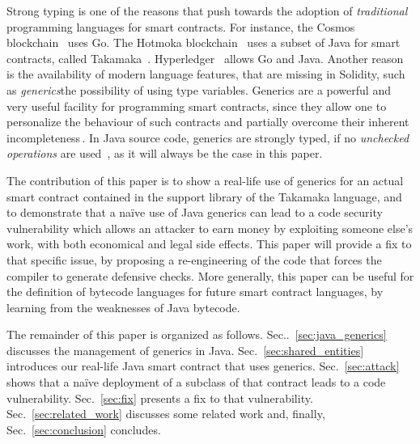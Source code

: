 Strong typing is one of the reasons that push towards the adoption
of \emph{traditional} programming languages for smart contracts. For instance,
the Cosmos blockchain~\cite{cosmos} uses Go. The
Hotmoka blockchain~\cite{hotmoka} uses a subset of Java
for smart contracts, called Takamaka~\cite{Spoto19,Spoto20}.
Hyperledger~\cite{hyperldeger} allows Go and Java.
Another reason is the availability of modern
language features, that are missing in Solidity,
such as \emph{generics}\ie the possibility of using
type variables. Generics are a powerful and very useful facility for programming
smart contracts, since they allow one to personalize the behaviour of such contracts and partially overcome their inherent incompleteness\,\cite{ebp}. In Java source code, generics are strongly typed, if no \emph{unchecked operations}
are used~\cite{NaftalinW06}, as it will always be the case in this paper.





The contribution of this paper is to show a real-life
use of generics for an actual smart contract contained in the support
library of the Takamaka language, and to demonstrate that a na\"{i}ve use
of Java generics can lead to a code security vulnerability which
allows an attacker to earn money by exploiting someone else's work, with both economical and legal side effects.
This paper will provide a fix to that specific issue,
by proposing a re-engineering of the code that forces the compiler to generate defensive checks.
More generally, this paper can be useful for the definition of
bytecode languages for future smart contract languages, by
learning from the weaknesses of Java bytecode.

The remainder of this paper is organized as follows.
Sec..~\ref{sec:java_generics} discusses the management of generics in Java.
Sec.~\ref{sec:shared_entities} introduces our real-life Java smart
contract that uses generics. Sec.~\ref{sec:attack} shows that a na\"{i}ve
deployment of a subclass of that contract leads to a code vulnerability.
Sec.~\ref{sec:fix} presents a fix to that vulnerability.
Sec.~\ref{sec:related_work} discusses some related work and, finally,
Sec.~\ref{sec:conclusion} concludes.

